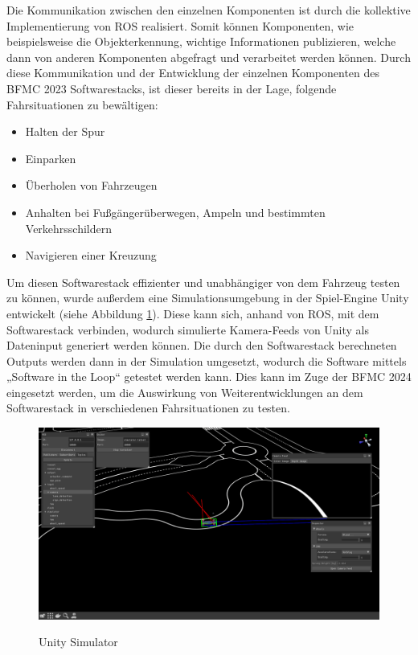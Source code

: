 Die Kommunikation zwischen den einzelnen Komponenten ist durch die kollektive Implementierung von \gls{ROS} realisiert. Somit können Komponenten, wie beispielsweise die Objekterkennung, wichtige Informationen publizieren, welche dann von anderen Komponenten abgefragt und verarbeitet werden können. Durch diese Kommunikation und der Entwicklung der einzelnen Komponenten des \gls{BFMC} 2023 Softwarestacks, ist dieser bereits in der Lage, folgende Fahrsituationen zu bewältigen:
\begin{itemize}
    \item Halten der Spur
    \item Einparken
    \item Überholen von Fahrzeugen
    \item Anhalten bei Fußgängerüberwegen, Ampeln und bestimmten Verkehrsschildern
    \item Navigieren einer Kreuzung
\end{itemize}

Um diesen Softwarestack effizienter und unabhängiger von dem Fahrzeug testen zu können, wurde außerdem eine Simulationsumgebung in der Spiel-Engine Unity entwickelt (siehe Abbildung \ref{fig:unitySimulator}). Diese kann sich, anhand von \gls{ROS}, mit dem Softwarestack verbinden, wodurch simulierte Kamera-Feeds von Unity als Dateninput generiert werden können.  Die durch den Softwarestack berechneten Outputs werden dann in der Simulation umgesetzt, wodurch die Software mittels „Software in the Loop“ getestet werden kann. Dies kann im Zuge der \gls{BFMC} 2024 eingesetzt werden, um die Auswirkung von Weiterentwicklungen an dem Softwarestack in verschiedenen Fahrsituationen zu testen.

\begin{figure}[H]
    \centering
    \includegraphics[width=1\linewidth]{Pictures/preview-2.png}
    \caption{Unity Simulator}
    \cite{hs_esslingen_git}
    \label{fig:unitySimulator}
\end{figure}

